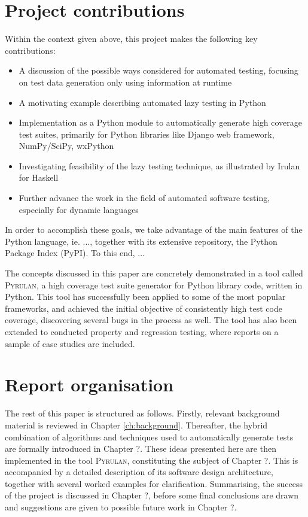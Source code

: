 \documentclass{icldt}
\numberwithin{equation}{section}       %
\begin{document}
\section{Project contributions}
Within the context given above, this project makes the following key contributions:

\begin{itemize}
	\item A discussion of the possible ways considered for automated testing, focusing on test data generation only using information at runtime
	\item A motivating example describing automated lazy testing in Python
	\item Implementation as a Python module to automatically generate high coverage test suites, primarily for Python libraries like Django web framework, NumPy/SciPy, wxPython
	\item Investigating feasibility of the lazy testing technique, as illustrated by Irulan for Haskell \cite{Allwood2011}
	\item Further advance the work in the field of automated software testing, especially for dynamic languages
\end{itemize}

In order to accomplish these goals, we take advantage of the main features of the Python language, ie. ..., together with its extensive repository, the Python Package Index (PyPI). To this end, ...

The concepts discussed in this paper are concretely demonstrated in a tool called \textsc{Pyrulan}, a high coverage test suite generator for Python library code, written in Python. This tool has successfully been applied to some of the most popular frameworks, and achieved the initial objective of consistently high test code coverage, discovering several bugs in the process as well. The tool has also been extended to conducted property and regression testing, where reports on a sample of case studies are included.

\section{Report organisation}
The rest of this paper is structured as follows. Firstly, relevant background material is reviewed in Chapter \ref{ch:background}. Thereafter, the hybrid combination of algorithms and techniques used to automatically generate tests are formally introduced in Chapter ?. These ideas presented here are then implemented in the tool \textsc{Pyrulan}, constituting the subject of Chapter ?. This is accompanied by a detailed description of its software design architecture, together with several worked examples for clarification. Summarising, the success of the project is discussed in Chapter ?, before some final conclusions are drawn and suggestions are given to possible future work in Chapter ?.
\end{document}
